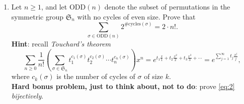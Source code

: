 \documentclass[11pt]{article}
\begin{document}
\begin{enumerate}
\item Let $n \geq 1$, and let $\mathrm{ODD}(n)$ denote the subset of permutations in the symmetric group $\mathfrak{S}_n$ with no cycles of even size. Prove that
\begin{equation}\label{eq:2}
\sum_{\sigma \in \mathrm{ODD}(n)} 2^{\#\mathrm{cycles}(\sigma)} = 2\cdot n!.
\end{equation}
{\bf Hint}: recall \emph{Touchard's theorem}
\[ \sum_{n \geq 0} \frac{1}{n!} \left(\sum_{\sigma\in \mathfrak{S}_n}t_1^{c_1(\sigma)} t_2^{c_2(\sigma)} \cdots t_n^{c_n(\sigma)} \right)  x^n = e^{t_1\frac{x}{1} + t_2\frac{x^2}{2} + t_3\frac{x^3}{3}+\cdots} = e^{\sum_{j=1}^{\infty} t_j\frac{x^j}{j}},\]
where $c_k(\sigma)$ is the number of cycles of $\sigma$ of size $k$. \\
{\bf Hard bonus problem, just to think about, not to do}: prove \eqref{eq:2} \emph{bijectively}.


\end{enumerate}
\end{document}

